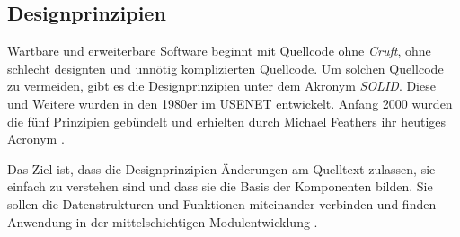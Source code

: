 
\subsection{Designprinzipien}
\label{sec:Designprinzipien}

Wartbare und erweiterbare Software beginnt mit Quellcode ohne \textit{Cruft}, ohne schlecht designten und unnötig komplizierten Quellcode. Um solchen Quellcode zu vermeiden, gibt es die Designprinzipien unter dem Akronym \textit{SOLID}. Diese und Weitere wurden in den 1980er im USENET entwickelt. Anfang 2000 wurden die fünf Prinzipien gebündelt und erhielten durch Michael Feathers ihr heutiges Acronym \citep[vgl.][58]{martin2018}.

Das Ziel ist, dass die Designprinzipien Änderungen am Quelltext zulassen, sie einfach zu verstehen sind und dass sie die Basis der Komponenten bilden. Sie sollen die Datenstrukturen und Funktionen miteinander verbinden und finden Anwendung in der mittelschichtigen Modulentwicklung \citep[vgl.][58]{martin2018}.



